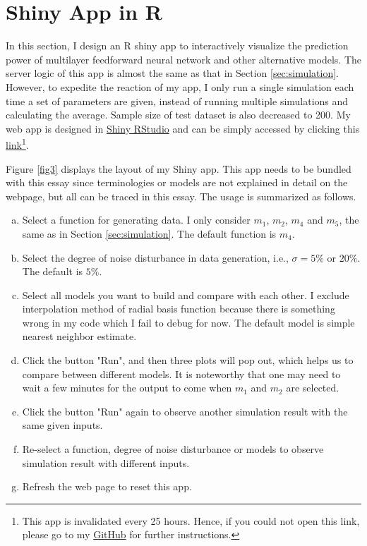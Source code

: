 \section{Shiny App in R}
\label{sec:shiny}

In this section, I design an R shiny app to interactively visualize the prediction power of multilayer feedforward neural network and other alternative models. The server logic of this app is almost the same as that in Section \ref{sec:simulation}. However, to expedite the reaction of my app, I only run a single simulation each time a set of parameters are given, instead of running multiple simulations and calculating the average. Sample size of test dataset is also decreased to 200. My web app is designed in \href{https://shiny.rstudio.com}{Shiny RStudio} and can be simply accessed by clicking this \href{https://ccfang2.shinyapps.io/neuralxSim/}{link}\footnote{This app is invalidated every 25 hours. Hence, if you could not open this link, please go to my \href{https://github.com/ccfang2/TopicsMetricsStats2022}{GitHub} for further instructions.}.

Figure \ref{fig3} displays the layout of my Shiny app. This app needs to be bundled with this essay since terminologies or models are not explained in detail on the webpage, but all can be traced in this essay. The usage is summarized as follows.

\begin{enumerate}[(a)]
    \item Select a function for generating data. I only consider $m_1$, $m_2$, $m_4$ and $m_5$, the same as in Section \ref{sec:simulation}. The default function is $m_4$.
    \item Select the degree of noise disturbance in data generation, i.e., $\sigma=5\%$ or $20\%$. The default is $5\%$.
    \item Select all models you want to build and compare with each other. I exclude interpolation method of radial basis function because there is something wrong in my code which I fail to debug for now. The default model is simple nearest neighbor estimate.
    \item Click the button "Run", and then three plots will pop out, which helps us to compare between different models. It is noteworthy that one may need to wait a few minutes for the output to come when $m_1$ and $m_2$ are selected.
    \item Click the button "Run" again to observe another simulation result with the same given inputs.
    \item Re-select a function, degree of noise disturbance or models to observe simulation result with different inputs.
    \item Refresh the web page to reset this app.
\end{enumerate}

